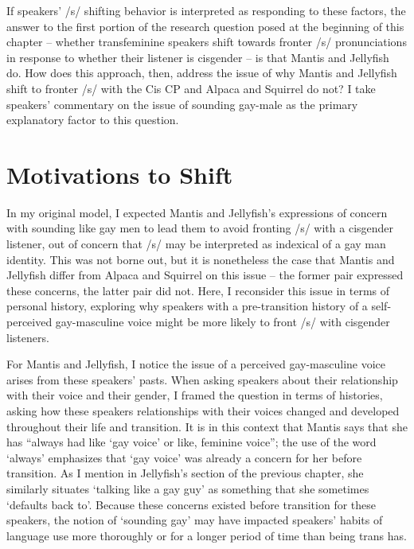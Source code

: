 \documentclass[12pt,twoside]{reedthesis}
\begin{document}
If speakers' /s/ shifting behavior is interpreted as responding to these factors, the answer to the first portion of the research question posed at the beginning of this chapter -- whether transfeminine speakers shift towards fronter /s/ pronunciations in response to whether their listener is cisgender -- is that Mantis and Jellyfish do. How does this approach, then, address the issue of why Mantis and Jellyfish shift to fronter /s/ with the Cis CP and Alpaca and Squirrel do not? I take speakers' commentary on the issue of sounding gay-male as the primary explanatory factor to this question.

\section{Motivations to Shift}

In my original model, I expected Mantis and Jellyfish's expressions of concern with sounding like gay men to lead them to avoid fronting /s/ with a cisgender listener, out of concern that /s/ may be interpreted as indexical of a gay man identity. This was not borne out, but it is nonetheless the case that Mantis and Jellyfish differ from Alpaca and Squirrel on this issue -- the former pair expressed these concerns, the latter pair did not. Here, I reconsider this issue in terms of personal history, exploring why speakers with a pre-transition history of a self-perceived gay-masculine voice might be more likely to front /s/ with cisgender listeners.

For Mantis and Jellyfish, I notice the issue of a perceived gay-masculine voice arises from these speakers' pasts. When asking speakers about their relationship with their voice and their gender, I framed the question in terms of histories, asking how these speakers relationships with their voices changed and developed throughout their life and transition. It is in this context that Mantis says that she has ``always had like `gay voice' or like, feminine voice''; the use of the word `always' emphasizes that `gay voice' was already a concern for her before transition. As I mention in Jellyfish's section of the previous chapter, she similarly situates `talking like a gay guy' as something that she sometimes `defaults back to'. Because these concerns existed before transition for these speakers, the notion of `sounding gay' may have impacted speakers' habits of language use more thoroughly or for a longer period of time than being trans has.
\end{document}
